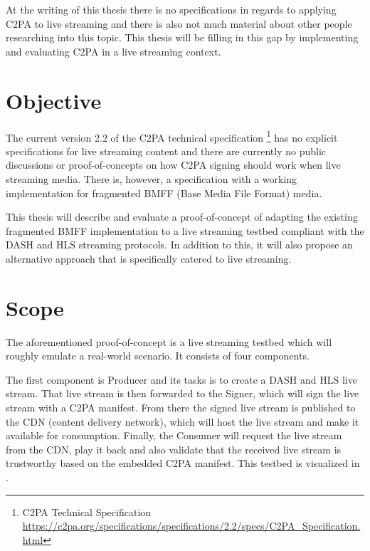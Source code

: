 At the writing of this thesis there is no specifications in regards to applying C2PA to live streaming and there is also not much material about other people researching into this topic. This thesis will be filling in this gap by implementing and evaluating C2PA in a live streaming context.

\section{Objective\label{sec:objective}}

The current version 2.2 of the C2PA technical specification \footnote{C2PA Technical Specification \url{https://c2pa.org/specifications/specifications/2.2/specs/C2PA_Specification.html}} has no explicit specifications for live streaming content and there are currently no public discussions or proof-of-concepts on how C2PA signing should work when live streaming media. There is, however, a specification with a working implementation for fragmented BMFF (Base Media File Format) media.

This thesis will describe and evaluate a proof-of-concept of adapting the existing fragmented BMFF implementation to a live streaming testbed compliant with the DASH and HLS streaming protocols. In addition to this, it will also propose an alternative approach that is specifically catered to live streaming.

\section{Scope\label{sec:scope}}

The aforementioned proof-of-concept is a live streaming testbed which will roughly emulate a real-world scenario. It consists of four components.

The first component is Producer and its tasks is to create a DASH and HLS live stream. That live stream is then forwarded to the Signer, which will sign the live stream with a C2PA manifest. From there the signed live stream is published to the CDN (content delivery network), which will host the live stream and make it available for consumption. Finally, the Consumer will request the live stream from the CDN, play it back and also validate that the received live stream is trustworthy based on the embedded C2PA manifest. This testbed is visualized in .

